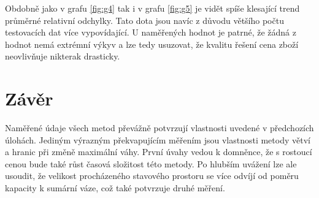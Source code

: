 \documentclass{article}
\begin{document}
Obdobně jako v grafu \ref{fig:g4} tak i v grafu \ref{fig:g5} je vidět spíše klesající trend průměrné relativní odchylky.
Tato dota jsou navíc z důvodu většího počtu testovacích dat více vypovídající.
U naměřených hodnot je patrné, že žádná z hodnot nemá extrémní výkyv a lze tedy usuzovat, že kvalitu řešení cena zboží neovlivňuje nikterak drasticky.

\section{Závěr}

Naměřené údaje všech metod převážně potvrzují vlastnosti uvedené v předchozích úlohách.
Jediným výrazným překvapujícím měřením jsou vlastnosti metody větví a hranic při změně maximální váhy.
První úvahy vedou k domněnce, že s rostoucí cenou bude také růst časová složitost této metody.
Po hlubším uvážení lze ale usoudit, že velikost procházeného stavového prostoru se více odvíjí od poměru kapacity k sumární váze, což také potvrzuje druhé měření.
\end{document}
